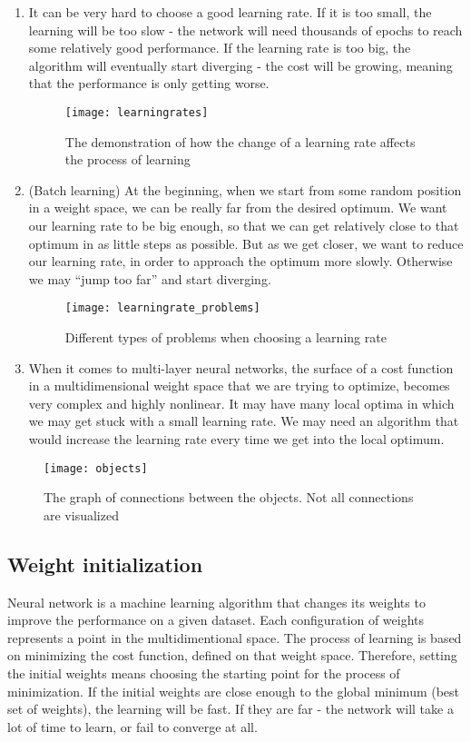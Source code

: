 \begin{enumerate}
  \item It can be very hard to choose a good learning rate. If it is too small, the learning will be too slow - the network will need thousands of epochs to reach some relatively good performance. If the learning rate is too big, the algorithm will eventually start diverging - the cost will be growing, meaning that the performance is only getting worse.
  
\begin{figure}[H]
  \centering
  \texttt{[image: learningrates]}
  \caption{The demonstration of how the change of a learning rate affects the process of learning}
  \label{fig:learningrates}
\end{figure}
  
  \item (Batch learning) At the beginning, when we start from some random position in a weight space, we can be really far from the desired optimum. We want our learning rate to be big enough, so that we can get relatively close to that optimum in as little steps as possible. But as we get closer, we want to reduce our learning rate, in order to approach the optimum more slowly. Otherwise we may “jump too far” and start diverging.
  
\begin{figure}[H]
  \centering
  \texttt{[image: learningrate\_problems]}
  \caption{Different types of problems when choosing a learning rate}
  \label{fig:learningrate_problems}
\end{figure}
  
  \item When it comes to multi-layer neural networks, the surface of a cost function in a multidimensional weight space that we are trying to optimize, becomes very complex and highly nonlinear. It may have many local optima in which we may get stuck with a small learning rate. We may need an algorithm that would increase the learning rate every time we get into the local optimum.
\end{enumerate}

\begin{figure}[H]
  \centering
  \texttt{[image: objects]}
  \caption{The graph of connections between the objects. Not all connections are visualized}
  \label{fig:objects}
\end{figure}

\subsection{Weight initialization}
Neural network is a machine learning algorithm that changes its weights to improve the performance on a given dataset. Each configuration of weights represents a point in the multidimentional space. The process of learning is based on minimizing the cost function, defined on that weight space. Therefore, setting the initial weights means choosing the starting point for the process of minimization. If the initial weights are close enough to the global minimum (best set of weights), the learning will be fast. If they are far - the network will take a lot of time to learn, or fail to converge at all.

